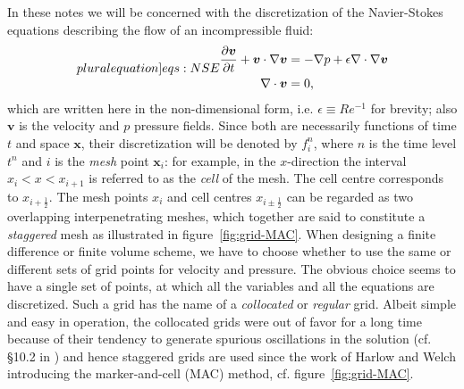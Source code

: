 \documentclass{article}
\numberwithin{equation}{section}
\begin{document}
In these notes we will be concerned with the discretization of the Navier-Stokes equations describing the flow of an incompressible fluid:
\begin{subequations}
\label[pluralequation]{eqs:NSE}
\begin{align}
\label{eqn:momentum-intro}
\frac{\partial \boldsymbol{v}}{\partial t} + \boldsymbol{v} \cdot \nabla \boldsymbol{v} &= -\nabla p + \epsilon \nabla \cdot \nabla \boldsymbol{v} \\
\label{eqn:continuity}
\nabla \cdot \boldsymbol{v} &= 0,
\end{align}
\end{subequations}
which are written here in the non-dimensional form, i.e. $\epsilon \equiv Re^{-1}$ for brevity; also $\boldsymbol{v}$ is the velocity and $p$ pressure fields. Since both are necessarily functions of time $t$ and space $\boldsymbol{x}$, their discretization will be denoted by $f^{n}_{i}$, where $n$ is the time level $t^{n}$ and $i$ is the \textit{mesh} point $\boldsymbol{x}_{i}$: for example, in the $x$-direction the interval $x_{i} < x < x_{i+1}$ is referred to as the \textit{cell} of the mesh. The cell centre corresponds to $x_{i+\frac{1}{2}}$. The mesh points $x_{i}$ and cell centres $x_{i \pm \frac{1}{2}}$ can be regarded as two overlapping interpenetrating meshes, which together are said to constitute a \textit{staggered} mesh as illustrated in figure~\ref{fig:grid-MAC}. When designing a finite difference or finite volume scheme, we have to choose whether to use the same or different sets of grid points for velocity and pressure. The obvious choice seems to have a single set of points, at which all the variables and all the equations are discretized. Such a grid
has the name of a \textit{collocated} or \textit{regular} grid. Albeit simple and easy in operation, the collocated grids were out of favor for a long time because of their tendency to generate spurious oscillations in the solution (cf. \S 10.2 in \cite{Zikanov:2010}) and hence staggered grids are used since the work of Harlow and Welch \cite{Harlow:1965} introducing the marker-and-cell (MAC) method, cf. figure~\ref{fig:grid-MAC}.
\end{document}
